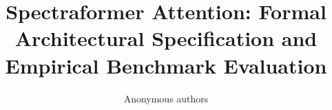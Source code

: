 \title{\textbf{Spectraformer Attention: Formal Architectural Specification and Empirical Benchmark Evaluation}}

\author{Anonymous authors}
